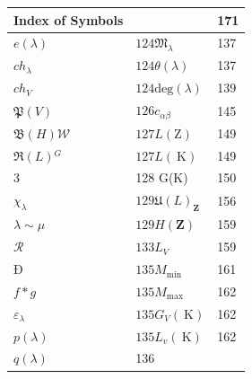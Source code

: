 \documentclass[10pt]{article}
\begin{document}
\begin{center}
\begin{tabular}{|l|l|l|}
\hline
Index of Symbols &  & 171 \\
\hline
$e(\lambda)$ & $124 \mathfrak{M}_{\lambda}$ & 137 \\
\hline
$c h_{\lambda}$ & $124 \theta(\lambda)$ & 137 \\
\hline
$c h_{V}$ & $124 \mathrm{deg}(\lambda)$ & 139 \\
\hline
$\mathfrak{P}(V)$ & $126 c_{\alpha \beta}$ & 145 \\
\hline
$\mathfrak{B}(H) \mathscr{W}$ & $127 L(\mathrm{Z})$ & 149 \\
\hline
$\Re(L){ }^{G}$ & $127 L(\mathrm{~K})$ & 149 \\
\hline
3 & 128 G(K) & 150 \\
\hline
$\chi_{\lambda}$ & $129 \mathfrak{U}(L)_{\mathbf{Z}}$ & 156 \\
\hline
$\lambda \sim \mu$ & $129 H(\mathbf{Z})$ & 159 \\
\hline
$\mathscr{R}$ & $133 L_{V}$ & 159 \\
\hline
Đ & $135 M_{\text {min }}$ & 161 \\
\hline
$f * g$ & $135 M_{\text {max }}$ & 162 \\
\hline
$\varepsilon_{\lambda}$ & $135 G_{V}(\mathrm{~K})$ & 162 \\
\hline
$p(\lambda)$ & $135 L_{v}(\mathrm{~K})$ & 162 \\
\hline
$q(\lambda)$ & 136 &  \\
\hline
\end{tabular}
\end{center}
\end{document}
